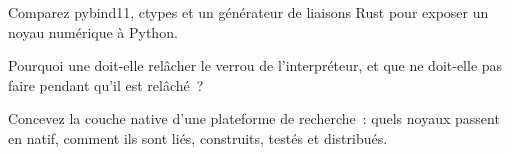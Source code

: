 \begin{interviewq}\label{iq:pl:native-extensions:3}
Comparez pybind11, ctypes et un générateur de liaisons Rust pour exposer un noyau numérique à Python.
\end{interviewq}

\begin{interviewq}\label{iq:pl:native-extensions:4}
Pourquoi une  doit-elle relâcher le verrou de l'interpréteur, et que ne doit-elle pas faire pendant qu'il est relâché~?
\end{interviewq}

\begin{interviewq}\label{iq:pl:native-extensions:5}
Concevez la couche native d'une plateforme de recherche~: quels noyaux passent en natif, comment ils sont liés, construits, testés et distribués.
\end{interviewq}
